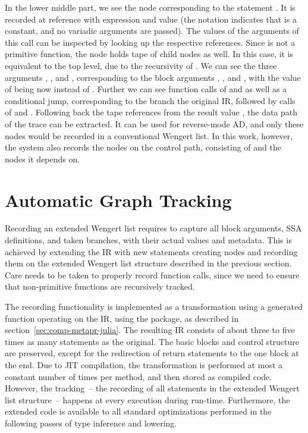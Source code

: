 In the lower middle part, we see the node corresponding to the statement .  It is recorded at reference  with expression  and value
 (the notation  indicates that  is a constant, and
no variadic arguments are passed). The values of the arguments of this call can be inspected by
looking up the respective references.  Since  is not a primitive function, the node
holds tape of child nodes as well.  In this case, it is equivalent to the top level, due to the
recursivity of . We can see the three arguments , , and ,
corresponding to the block arguments , , and , with the value of
 being now  instead of .  Further we can see function calls of
 and \jlinl{<} as well as a conditional jump, corresponding to the branch the original
IR, followed by calls of \jlinl{+} and . Following back the tape references from the
result value , the data path of the trace can be extracted.  It can be used for
reverse-mode AD, and only these nodes would be recorded in a conventional Wengert list.  In this
work, however, the system also records the nodes on the control path, consisting of  and
the nodes it depends on.


\section{Automatic Graph Tracking}
\label{sec:autom-graph-track}

Recording an extended Wengert list requires to capture all block arguments, SSA definitions, and
taken branches, with their actual values and metadata. This is achieved by extending the IR with new
statements creating nodes and recording them on the extended Wengert list structure described in the
previous section. Care needs to be taken to properly record function calls, since we need to ensure
that non-primitive functions are recursively tracked.

The recording functionality is implemented as a transformation using a generated function operating
on the IR, using the  package, as described in
section~\ref{sec:comp-metapr-julia}.  The resulting IR consists of about three to five times as many
statements as the original.  The basic blocks and control structure are preserved, except for the
redirection of return statements to the one block at the end.  Due to JIT compilation, the
transformation is performed at most a constant number of times per method, and then stored as
compiled code.  However, the tracking~-- the recording of all statements in the extended Wengert
list structure~-- happens at every execution during run-time.  Furthermore, the extended code is
available to all standard optimizations performed in the following passes of type inference and
lowering.

